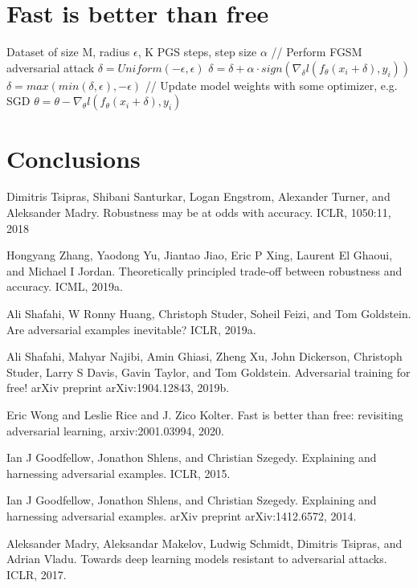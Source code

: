 \documentclass{article}
\begin{document}
\section{Fast is better than free}

\begin{algorithm}[H]
	\caption{FGSM adversarial training for T epochs}
	\begin{algorithmic}[1]
		\Require Dataset of size M, radius $\epsilon$, K PGS steps, step size $\alpha$
		\State // Perform FGSM adversarial attack
		\State $\delta = Uniform(-\epsilon, \epsilon)$
		\State $\delta = \delta + \alpha \cdot sign(\nabla_{\delta} l(f_{\theta}(x_i + \delta), y_i))$
		\State $\delta = max(min(\delta, \epsilon), -\epsilon)$
		\State // Update model weights with some optimizer, e.g. SGD
		\State $\theta = \theta - \nabla_{\theta} l(f_{\theta}(x_i + \delta), y_i)$
		\EndFor
		\EndFor
	\end{algorithmic}
\end{algorithm}

\section{Conclusions}

\begin{thebibliography}{100} 
	 {Dimitris Tsipras, Shibani Santurkar, Logan Engstrom, Alexander Turner, and Aleksander Madry. Robustness may be at odds with accuracy. ICLR, 1050:11, 2018}

	 {Hongyang Zhang, Yaodong Yu, Jiantao Jiao, Eric P Xing, Laurent El Ghaoui, and Michael I Jordan. Theoretically principled trade-off between robustness and accuracy. ICML, 2019a.}
	
	 {Ali Shafahi, W Ronny Huang, Christoph Studer, Soheil Feizi, and Tom Goldstein. Are adversarial examples inevitable? ICLR, 2019a.}
	
	 {Ali Shafahi, Mahyar Najibi, Amin Ghiasi, Zheng Xu, John Dickerson, Christoph Studer, Larry S
		Davis, Gavin Taylor, and Tom Goldstein. Adversarial training for free!
		arXiv preprint
		arXiv:1904.12843, 2019b.}
	
	 {Eric Wong and Leslie Rice and J. Zico Kolter. Fast is better than free: revisiting adversarial learning, arxiv:2001.03994, 2020.}
	
	 {Ian J Goodfellow, Jonathon Shlens, and Christian Szegedy. Explaining and harnessing adversarial examples. ICLR, 2015.}
	
	 {Ian J Goodfellow, Jonathon Shlens, and Christian Szegedy. Explaining and harnessing adversarial examples. arXiv preprint arXiv:1412.6572, 2014.}
	
	 {Aleksander Madry, Aleksandar Makelov, Ludwig Schmidt, Dimitris Tsipras, and Adrian Vladu. Towards deep learning models resistant to adversarial attacks. ICLR, 2017.}
	
\end{thebibliography}
	
\end{document}
